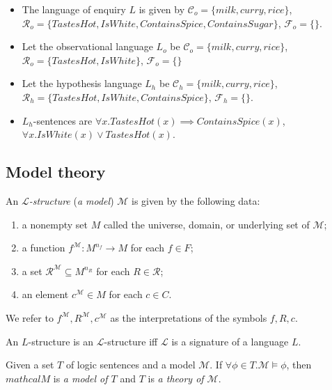 \begin{exmp}
\begin{itemize}
\item The language of enquiry $L$ is given by $\mathcal{C}_o=\{milk, curry, rice\}$,$\mathcal{R}_o=\{TastesHot, IsWhite, ContainsSpice, ContainsSugar\}$, $\mathcal{F}_o=\{\}$.
\item Let the observational language $L_o$ be $\mathcal{C}_o=\{milk, curry, rice\}$,\\ $\mathcal{R}_o=\{TastesHot, IsWhite\}$, $\mathcal{F}_o=\{\}$
\item Let the hypothesis language $L_h$ be $\mathcal{C}_h=\{milk, curry, rice\}$,\\ $\mathcal{R}_h=\{TastesHot, IsWhite, ContainsSpice\}$, $\mathcal{F}_h=\{\}$.
\item $L_h$-sentences are $\forall x. TastesHot(x) \implies ContainsSpice(x)$,\\ $\forall x. IsWhite(x) \lor TastesHot(x)$.
\end{itemize}
\end{exmp}

\subsection{Model theory\cite{marker2002}}

\begin{defn}
An \emph{$\mathcal{L}$-structure} (\emph{a model}) $\mathcal{M}$ is given by the following data:
\begin{enumerate}
\item a nonempty set $M$ called the universe, domain, or underlying set of $\mathcal{M}$;
\item a function $f^{\mathcal{M}} : M^{n_f} \to M$ for each $f \in F$;
\item a set $\mathcal{R}^{\mathcal{M}} \subseteq M^{n_R}$ for each $R \in \mathcal{R}$;
\item an element $c^\mathcal{M} \in M$ for each $c \in C$.
\end{enumerate}
We refer to $f^\mathcal{M}, R^\mathcal{M}, c^\mathcal{M}$ as the interpretations of the symbols $f ,R, c$.
\end{defn}

\begin{remark}
An $L$-structure is an $\mathcal{L}$-structure iff $\mathcal{L}$ is a signature of a language $L$.
\end{remark}

\begin{defn}
Given a set $T$ of logic sentences and a model $\mathcal{M}$. If $\forall \phi \in T. \mathcal{M} \models \phi$, then $mathcal{M}$ is \emph{a model of $T$} and $T$ is \emph{a theory of $\mathcal{M}$}.
\end{defn}

